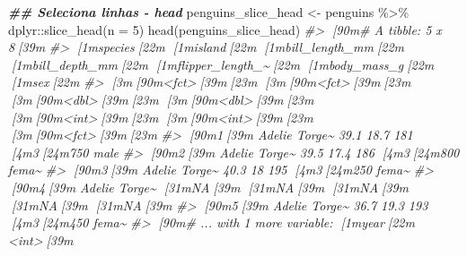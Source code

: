 \documentclass[
]{book}
\newenvironment{Shaded}{\begin{snugshade}}{\end{snugshade}}
\newcommand{\AttributeTok}[1]{\textcolor[rgb]{0.61,0.61,0.61}{#1}}
\newcommand{\CommentTok}[1]{\textcolor[rgb]{0.37,0.37,0.37}{\textit{#1}}}
\newcommand{\DecValTok}[1]{\textcolor[rgb]{0.06,0.06,0.06}{#1}}
\newcommand{\DocumentationTok}[1]{\textcolor[rgb]{0.37,0.37,0.37}{\textbf{\textit{#1}}}}
\newcommand{\FunctionTok}[1]{\textcolor[rgb]{0,0,0}{#1}}
\newcommand{\NormalTok}[1]{#1}
\newcommand{\OtherTok}[1]{\textcolor[rgb]{0.37,0.37,0.37}{#1}}
\newcommand{\SpecialCharTok}[1]{\textcolor[rgb]{0,0,0}{#1}}
\begin{document}
\begin{Shaded}
\begin{Highlighting}[]
\DocumentationTok{\#\# Seleciona linhas {-} head}
\NormalTok{penguins\_slice\_head }\OtherTok{\textless{}{-}}\NormalTok{ penguins }\SpecialCharTok{\%\textgreater{}\%} 
\NormalTok{  dplyr}\SpecialCharTok{::}\FunctionTok{slice\_head}\NormalTok{(}\AttributeTok{n =} \DecValTok{5}\NormalTok{)}
\FunctionTok{head}\NormalTok{(penguins\_slice\_head)}
\CommentTok{\#\textgreater{} [90m\# A tibble: 5 x 8[39m}
\CommentTok{\#\textgreater{}   [1mspecies[22m [1misland[22m [1mbill\_length\_mm[22m [1mbill\_depth\_mm[22m [1mflipper\_length\_\textasciitilde{}[22m [1mbody\_mass\_g[22m [1msex[22m  }
\CommentTok{\#\textgreater{}   [3m[90m\textless{}fct\textgreater{}[39m[23m   [3m[90m\textless{}fct\textgreater{}[39m[23m           [3m[90m\textless{}dbl\textgreater{}[39m[23m         [3m[90m\textless{}dbl\textgreater{}[39m[23m            [3m[90m\textless{}int\textgreater{}[39m[23m       [3m[90m\textless{}int\textgreater{}[39m[23m [3m[90m\textless{}fct\textgreater{}[39m[23m}
\CommentTok{\#\textgreater{} [90m1[39m Adelie  Torge\textasciitilde{}           39.1          18.7              181        [4m3[24m750 male }
\CommentTok{\#\textgreater{} [90m2[39m Adelie  Torge\textasciitilde{}           39.5          17.4              186        [4m3[24m800 fema\textasciitilde{}}
\CommentTok{\#\textgreater{} [90m3[39m Adelie  Torge\textasciitilde{}           40.3          18                195        [4m3[24m250 fema\textasciitilde{}}
\CommentTok{\#\textgreater{} [90m4[39m Adelie  Torge\textasciitilde{}           [31mNA[39m            [31mNA[39m                 [31mNA[39m          [31mNA[39m [31mNA[39m   }
\CommentTok{\#\textgreater{} [90m5[39m Adelie  Torge\textasciitilde{}           36.7          19.3              193        [4m3[24m450 fema\textasciitilde{}}
\CommentTok{\#\textgreater{} [90m\# ... with 1 more variable: [1myear[22m \textless{}int\textgreater{}[39m}


\end{Highlighting}
\end{Shaded}
\end{document}
